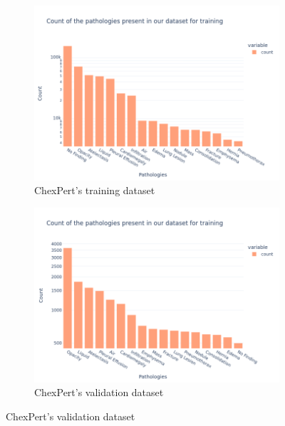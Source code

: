 \documentclass[11pt]{article}
\begin{document}
\begin{figure}[h]
     \centering
     \begin{subfigure}[b]{0.45\linewidth}
         \centering
         \includegraphics[width=\linewidth]{plots/histogram_ciusss_train}
         \caption{ChexPert's training dataset}
         \vspace{4ex}
         \label{fig:histogram_ciusss_train}
     \end{subfigure}
     \hfill
     \begin{subfigure}[b]{0.45\linewidth}
         \centering
         \includegraphics[width=\linewidth]{plots/histogram_ciusss_valid}
         \caption{ChexPert's validation dataset}
         \vspace{4ex}
         \label{fig:histogram_ciusss_valid}
     \end{subfigure}



\end{figure}
\end{document}
